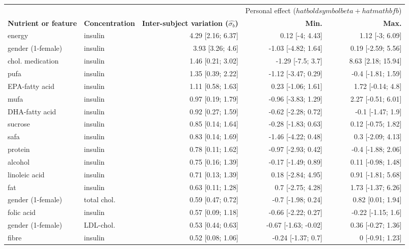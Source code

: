 \documentclass[border=1mm, preview]{standalone}
\begin{document}
\begin{table}[H]
\centering
\begin{tabular}{llrrr}
\toprule
\multicolumn{3}{c}{ } & \multicolumn{2}{c}{Personal effect ($hat{boldsymbol{beta}} + hat{mathbf{b}}$)} \\
\cmidrule(l{3pt}r{3pt}){4-5}
\textbf{Nutrient or feature} & \textbf{Concentration} & \textbf{Inter-subject variation ($\hat{\sigma_b}$)} & \textbf{Min.} & \textbf{Max.}\\
\midrule
energy & insulin & 4.29 [2.16; 6.37] & 0.12 [-4; 4.43] & 1.12 [-3; 6.09]\\
gender (1-female) & insulin & 3.93 [3.26; 4.6] & -1.03 [-4.82; 1.64] & 0.19 [-2.59; 5.56]\\
chol. medication & insulin & 1.46 [0.21; 3.02] & -1.29 [-7.5; 3.7] & 8.63 [2.18; 15.94]\\
pufa & insulin & 1.35 [0.39; 2.22] & -1.12 [-3.47; 0.29] & -0.4 [-1.81; 1.59]\\
EPA-fatty acid & insulin & 1.11 [0.58; 1.63] & 0.23 [-1.06; 1.61] & 1.72 [-0.14; 4.8]\\
\addlinespace
mufa & insulin & 0.97 [0.19; 1.79] & -0.96 [-3.83; 1.29] & 2.27 [-0.51; 6.01]\\
DHA-fatty acid & insulin & 0.92 [0.27; 1.59] & -0.62 [-2.28; 0.72] & -0.1 [-1.47; 1.9]\\
sucrose & insulin & 0.85 [0.14; 1.64] & -0.28 [-1.83; 0.63] & 0.12 [-0.75; 1.82]\\
safa & insulin & 0.83 [0.14; 1.69] & -1.46 [-4.22; 0.48] & 0.3 [-2.09; 4.13]\\
protein & insulin & 0.78 [0.11; 1.62] & -0.97 [-2.93; 0.42] & -0.4 [-1.88; 2.06]\\
\addlinespace
alcohol & insulin & 0.75 [0.16; 1.39] & -0.17 [-1.49; 0.89] & 0.11 [-0.98; 1.48]\\
linoleic acid & insulin & 0.71 [0.13; 1.39] & 0.18 [-2.84; 4.95] & 0.91 [-1.81; 5.68]\\
fat & insulin & 0.63 [0.11; 1.28] & 0.7 [-2.75; 4.28] & 1.73 [-1.37; 6.26]\\
gender (1-female) & total chol. & 0.59 [0.47; 0.72] & -0.7 [-1.98; 0.24] & 0.82 [0.01; 1.94]\\
folic acid & insulin & 0.57 [0.09; 1.18] & -0.66 [-2.22; 0.27] & -0.22 [-1.15; 1.6]\\
\addlinespace
gender (1-female) & LDL-chol. & 0.53 [0.44; 0.63] & -0.67 [-1.63; -0.02] & 0.36 [-0.27; 1.36]\\
fibre & insulin & 0.52 [0.08; 1.06] & -0.24 [-1.37; 0.7] & 0 [-0.91; 1.23]\\

\end{tabular}
\end{table}
\end{document}
